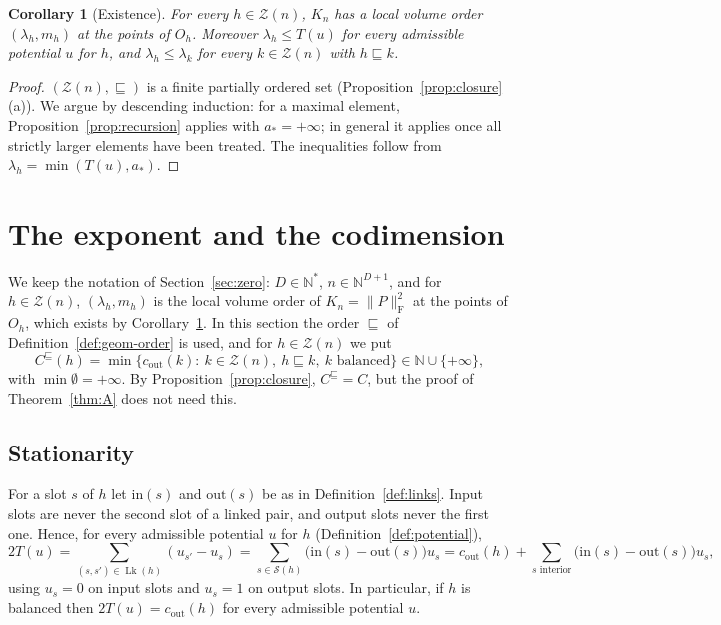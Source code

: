 \documentclass[11pt,a4paper]{article}
\newtheorem{corollary}[theorem]{Corollary}
\theoremstyle{definition}
\theoremstyle{remark}
\numberwithin{equation}{section}
\newcommand{\N}{\mathbb{N}}
\newcommand{\Fr}[1]{\lVert #1\rVert_{\mathrm F}}
\newcommand{\cout}{c_{\mathrm{out}}}
\newcommand{\Zb}{\mathcal Z}
\newcommand{\Sl}{\mathcal S}
\newcommand{\Lk}{\operatorname{Lk}}
\begin{document}
\begin{corollary}[Existence]\label{cor:existence}
For every $h\in\Zb(n)$, $K_n$ has a local volume order $(\lambda_h,m_h)$ at the points of $O_h$. Moreover $\lambda_h\le T(u)$ for every admissible potential $u$ for $h$, and $\lambda_h\le\lambda_k$ for every $k\in\Zb(n)$ with $h\sqsubseteq k$.
\end{corollary}
\begin{proof}
$(\Zb(n),\sqsubseteq)$ is a finite partially ordered set (Proposition~\ref{prop:closure}(a)). We argue by descending induction: for a maximal element, Proposition~\ref{prop:recursion} applies with $a_*=+\infty$; in general it applies once all strictly larger elements have been treated. The inequalities follow from $\lambda_h=\min(T(u),a_*)$.
\end{proof}
\section{The exponent and the codimension}\label{sec:exponent}

We keep the notation of Section~\ref{sec:zero}: $D\in\N^*$, $n\in\N^{D+1}$, and for $h\in\Zb(n)$, $(\lambda_h,m_h)$ is the local volume order of $K_n=\Fr P^2$ at the points of $O_h$, which exists by Corollary~\ref{cor:existence}. In this section the order $\sqsubseteq$ of Definition~\ref{def:geom-order} is used, and for $h\in\Zb(n)$ we put
\[
C^\sqsubseteq(h)=\min\{\cout(k):\ k\in\Zb(n),\ h\sqsubseteq k,\ k\text{ balanced}\}\in\N\cup\{+\infty\},
\]
with $\min\emptyset=+\infty$. By Proposition~\ref{prop:closure}, $C^\sqsubseteq=C$, but the proof of Theorem~\ref{thm:A} does not need this.

\subsection{Stationarity}
For a slot $s$ of $h$ let $\mathrm{in}(s)$ and $\mathrm{out}(s)$ be as in Definition~\ref{def:links}. Input slots are never the second slot of a linked pair, and output slots never the first one. Hence, for every admissible potential $u$ for $h$ (Definition~\ref{def:potential}),
\begin{equation}\label{eq:telescope}
2T(u)=\sum_{(s,s')\in\Lk(h)}(u_{s'}-u_s)=\sum_{s\in\Sl(h)}\bigl(\mathrm{in}(s)-\mathrm{out}(s)\bigr)u_s=\cout(h)+\sum_{s\text{ interior}}\bigl(\mathrm{in}(s)-\mathrm{out}(s)\bigr)u_s ,
\end{equation}
using $u_s=0$ on input slots and $u_s=1$ on output slots. In particular, if $h$ is balanced then $2T(u)=\cout(h)$ for every admissible potential $u$.
\end{document}
